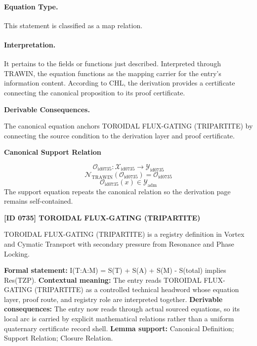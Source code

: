 \paragraph{Equation Type.}
This statement is classified as a map relation.

\paragraph{Interpretation.}
It pertains to the fields or functions just described. Interpreted through TRAWIN, the equation functions as the mapping carrier for the entry’s information content. According to CHL, the derivation provides a certificate connecting the canonical proposition to its proof certificate.

\par\vspace{0.35em}
\noindent\textbf{Derivable Consequences.}\quad
\begingroup
\footnotesize
\raggedright
The canonical equation anchors TOROIDAL FLUX-GATING (TRIPARTITE) by connecting the source condition to the derivation layer and proof certificate.
\par\endgroup

\noindent\textbf{Canonical Support Relation}\par
\[
\mathcal{O}_{\mathrm{id0735}}:\mathcal{X}_{\mathrm{id0735}}\longrightarrow\mathcal{Y}_{\mathrm{id0735}}
\]
\[
\mathcal{N}_{\mathrm{TRAWIN}}(\mathcal{O}_{\mathrm{id0735}})=\mathcal{O}_{\mathrm{id0735}}
\]
\[
\mathcal{O}_{\mathrm{id0735}}(x)\in\mathcal{Y}_{\mathrm{adm}}
\]
\noindent The support equation repeats the canonical relation so the derivation page remains self-contained.\par

\clearpage
\noindent\textbf{[ID 0735] TOROIDAL FLUX-GATING (TRIPARTITE)}\par
\vspace{0.35em}
\begingroup\small
{}
TOROIDAL FLUX-GATING (TRIPARTITE) is a registry definition in Vortex and Cymatic Transport with secondary pressure from Resonance and Phase Locking.

\begingroup\footnotesize\setlength{\emergencystretch}{3em}\sloppy
\textbf{Formal statement:} I(T:A:M) = S(T) + S(A) + S(M) - S(total) implies Res(TZP). \textbf{Contextual meaning:} The entry reads TOROIDAL FLUX-GATING (TRIPARTITE) as a controlled technical headword whose equation layer, proof route, and registry role are interpreted together. \textbf{Derivable consequences:} The entry now reads through actual sourced equations, so its local arc is carried by explicit mathematical relations rather than a uniform quaternary certificate record shell. \textbf{Lemma support:} Canonical Definition; Support Relation; Closure Relation.\par
\endgroup

